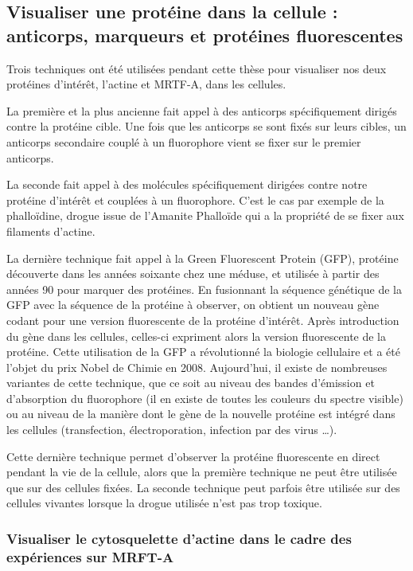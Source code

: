 	\subsection{Visualiser une protéine dans la cellule : anticorps, marqueurs et protéines fluorescentes}
	
	Trois techniques ont été utilisées pendant cette thèse pour visualiser nos deux protéines d'intérêt, l'actine et MRTF-A, dans les cellules. 
	
	La première et la plus ancienne fait appel à des anticorps spécifiquement dirigés contre la protéine cible. Une fois que les anticorps se sont fixés sur leurs cibles, un anticorps secondaire couplé à un fluorophore vient se fixer sur le premier anticorps. 
	
	La seconde fait appel à des molécules spécifiquement dirigées contre notre protéine d'intérêt et couplées à un fluorophore. C'est le cas par exemple de la phalloïdine, drogue issue de l'Amanite Phalloïde qui a la propriété de se fixer aux filaments d'actine.	
	
	La dernière technique fait appel à la Green Fluorescent Protein (GFP), protéine découverte dans les années soixante chez une méduse, et utilisée à partir des années 90 pour marquer des protéines. En fusionnant la séquence génétique de la GFP avec la séquence de la protéine à observer, on obtient un nouveau gène codant pour une version fluorescente de la protéine d'intérêt. Après introduction du gène dans les cellules, celles-ci expriment alors la version fluorescente de la protéine. Cette utilisation de la GFP a révolutionné la biologie cellulaire et a été l'objet du prix Nobel de Chimie en 2008. Aujourd'hui, il existe de nombreuses variantes de cette technique, que ce soit au niveau des bandes d'émission et d'absorption du fluorophore (il en existe de toutes les couleurs du spectre visible) ou au niveau de la manière dont le gène de la nouvelle protéine est intégré dans les cellules (transfection, électroporation, infection par des virus  \dots).
	
	Cette dernière technique permet d'observer la protéine fluorescente en direct pendant la vie de la cellule, alors que la première technique ne peut être utilisée que sur des cellules fixées. La seconde technique peut parfois être utilisée sur des cellules vivantes lorsque la drogue utilisée n'est pas trop toxique. 
	
	\subsubsection{Visualiser le cytosquelette d'actine dans le cadre des expériences sur MRFT-A}
	
